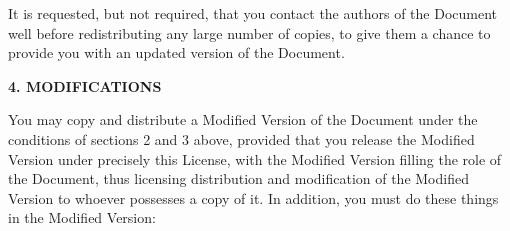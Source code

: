 \documentclass[a4paper,spanish,12pt]{book}
\begin{document}
It is requested, but not required, that you contact the authors of the
Document well before redistributing any large number of copies, to give
them a chance to provide you with an updated version of the Document.


\begin{center}
{\Large\bf 4. MODIFICATIONS\par}
\end{center}

You may copy and distribute a Modified Version of the Document under
the conditions of sections 2 and 3 above, provided that you release
the Modified Version under precisely this License, with the Modified
Version filling the role of the Document, thus licensing distribution
and modification of the Modified Version to whoever possesses a copy
of it.  In addition, you must do these things in the Modified Version:
\end{document}
